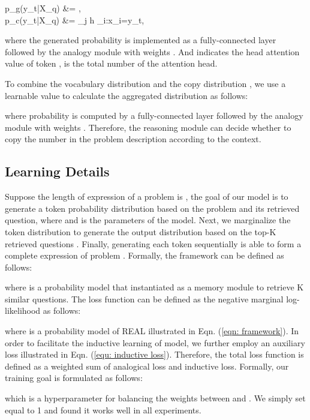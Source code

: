 \documentclass[11pt, a4paper]{article}
\begin{document}
		p_g(y_t|X_q) &= , \\
		p_c(y_t|X_q) &= \sum_{j \le h} \sum_{i:x_i=y_t},
	
where the generated probability  is implemented as a fully-connected layer  followed by the analogy module with weights . And  indicates the  head attention value \citep{vaswani2017attention} of token ,  is the total number of the attention head.

To combine the vocabulary distribution  and the copy distribution , we use a learnable value  to calculate the aggregated distribution  as follows:

where probability  is computed by a fully-connected layer followed by the analogy module with weights . Therefore, the reasoning module can decide whether to copy the number in the problem description according to the context.

\subsection{Learning Details}
Suppose the length of expression of a problem is , the goal of our model is to generate a token probability distribution  based on the problem and its retrieved question, where  and  is the parameters of the model. Next, we marginalize the token distribution to generate the  output distribution  based on the top-K retrieved questions . Finally, generating each token  sequentially is able to form a complete expression  of problem . Formally, the framework  can be defined as follows:

where  is a probability model that instantiated as a memory module to retrieve K similar questions. 
The loss function can be defined as the negative marginal log-likelihood as follows:

where  is a probability model of REAL illustrated in Eqn. (\ref{eqn: framework}). In order to facilitate the inductive learning of model, we further employ an auxiliary loss illustrated in Eqn. (\ref{equ: inductive loss}). Therefore, the total loss function is defined as a weighted sum of analogical loss and inductive loss. Formally, our training goal is formulated as follows:

which  is a hyperparameter for balancing the weights between  and . We simply set  equal to 1 and found it works well in all experiments. 
\end{document}
